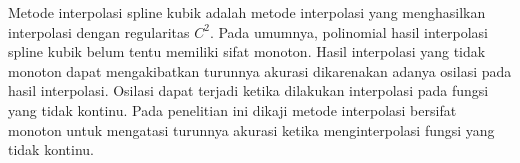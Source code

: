 \documentclass{skripsimathugm}
\begin{document}
\begin{abstractind}
Metode interpolasi spline kubik adalah metode interpolasi yang menghasilkan interpolasi dengan regularitas $C^2$. Pada umumnya, polinomial hasil interpolasi spline kubik belum tentu memiliki sifat monoton. Hasil interpolasi yang tidak monoton dapat mengakibatkan turunnya akurasi dikarenakan adanya osilasi pada hasil interpolasi. Osilasi dapat terjadi ketika dilakukan interpolasi pada fungsi yang tidak kontinu. Pada penelitian ini dikaji metode interpolasi bersifat monoton untuk mengatasi turunnya akurasi ketika menginterpolasi fungsi yang tidak kontinu.

\end{abstractind}
\end{document}
